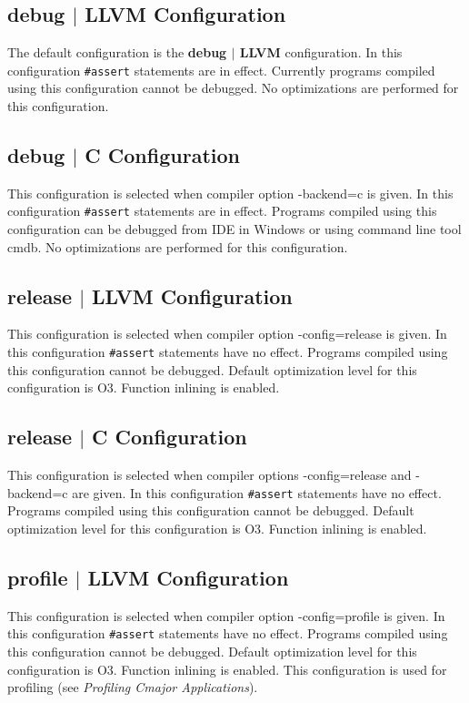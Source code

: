 \documentclass[oneside, a4paper, 11pt]{article}
\begin{document}
\subsection{debug $|$ LLVM Configuration}

The default configuration is the \textbf{debug $|$ LLVM} configuration. In this configuration \verb|#assert| statements are in effect.
Currently programs compiled using this configuration cannot be debugged. No optimizations are performed for this configuration.

\subsection{debug $|$ C Configuration}

This configuration is selected when compiler option -backend=c is given. In this configuration \verb|#assert| statements are in effect.
Programs compiled using this configuration can be debugged from IDE in Windows or using command line tool cmdb.
No optimizations are performed for this configuration.

\subsection{release $|$ LLVM Configuration}

This configuration is selected when compiler option -config=release is given. In this configuration \verb|#assert| statements have no effect.
Programs compiled using this configuration cannot be debugged. Default optimization level for this configuration is O3. Function inlining is enabled.

\subsection{release $|$ C Configuration}

This configuration is selected when compiler options -config=release and -backend=c are given. In this configuration \verb|#assert| statements have no effect.
Programs compiled using this configuration cannot be debugged. Default optimization level for this configuration is O3. Function inlining is enabled.

\subsection{profile $|$ LLVM Configuration}

This configuration is selected when compiler option -config=profile is given. In this configuration \verb|#assert| statements have no effect.
Programs compiled using this configuration cannot be debugged. Default optimization level for this configuration is O3. Function inlining is enabled.
This configuration is used for profiling (see \emph{Profiling Cmajor Applications}).
\end{document}
